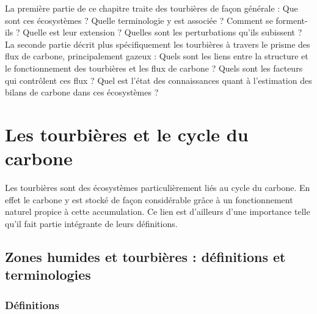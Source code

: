 \newpage
\doublespacing
{}
La première partie de ce chapitre traite des tourbières de façon générale : Que sont ces écosystèmes ?
Quelle terminologie y est associée ? Comment se forment-ils ? Quelle est leur extension ? Quelles sont les perturbations qu'ils subissent ?
La seconde partie décrit plus spécifiquement les tourbières à travers le prisme des flux de carbone, principalement gazeux : 
Quels sont les liens entre la structure et le fonctionnement des tourbières et les flux de carbone ? 
Quels sont les facteurs qui contrôlent ces flux ? 
Quel est l'état des connaissances quant à l'estimation des bilans de carbone dans ces écosystèmes ?

\section{Les tourbières et le cycle du carbone}

Les tourbières sont des écosystèmes particulièrement liés au cycle du carbone.
En effet le carbone y est stocké de façon considérable grâce à un fonctionnement naturel propice à cette accumulation.
Ce lien est d'ailleurs d'une importance telle qu'il fait partie intégrante de leurs définitions.


\subsection{Zones humides et tourbières : définitions et terminologies}

\subsubsection{Définitions}

